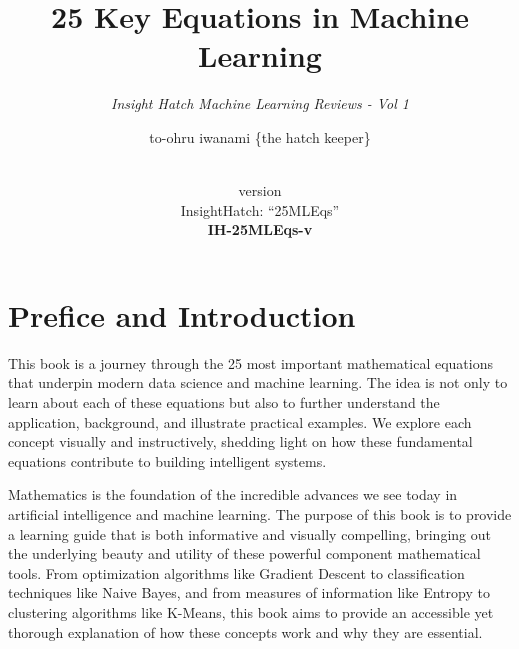 \documentclass[
  12 pt,
  a4paper,
]{book}
\title{25 Key Equations in Machine Learning}
\subtitle{\textit{Insight Hatch Machine Learning Reviews - Vol 1}}
\author{to-ohru iwanami \{the hatch keeper\}}
\date{\vhCurrentDate\\
version \vhCurrentVersion\\
InsightHatch: ``25MLEqs''\\
\textbf{IH-25MLEqs-v}\textbf{\vhCurrentVersion}}
\numberwithin{equation}{section}
\theoremstyle{plain}      %
\theoremstyle{definition} %
\theoremstyle{remark}     %
\theoremstyle{note}         %
\begin{document}
\frontmatter
\maketitle

{
\setcounter{tocdepth}{1}
\tableofcontents
}
\mainmatter
\hfill\break

\begin{versionhistory}
\end{versionhistory}
\newpage

\setcounter{table}{0}

\frontmatter

\hypertarget{prefice-and-introduction}{%
\chapter{Prefice and Introduction}\label{prefice-and-introduction}}

This book is a journey through the 25 most important mathematical
equations that underpin modern data science and machine learning. The
idea is not only to learn about each of these equations but also to
further understand the application, background, and illustrate practical
examples. We explore each concept visually and instructively, shedding
light on how these fundamental equations contribute to building
intelligent systems.

Mathematics is the foundation of the incredible advances we see today in
artificial intelligence and machine learning. The purpose of this book
is to provide a learning guide that is both informative and visually
compelling, bringing out the underlying beauty and utility of these
powerful component mathematical tools. From optimization algorithms like
Gradient Descent to classification techniques like Naive Bayes, and from
measures of information like Entropy to clustering algorithms like
K-Means, this book aims to provide an accessible yet thorough
explanation of how these concepts work and why they are essential.
\end{document}
